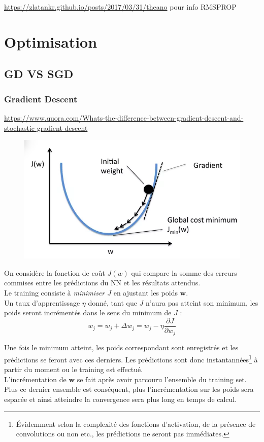 \documentclass[a4paper,12pt]{report}
\newcommand\bk{\color{black}}
\newcommand\brick{\color{brick}}
\numberwithin{equation}{section} %
\begin{document}
\url{https://zlatankr.github.io/posts/2017/03/31/theano} pour info RMSPROP
\pagebreak 
\section{Optimisation}
\brick \subsection{GD VS SGD} \bk
\subsubsection*{Gradient Descent}
\noindent \footnotesize{\url{https://www.quora.com/Whats-the-difference-between-gradient-descent-and-stochastic-gradient-descent} } \normalsize

\begin{figure} 
\vspace{-15pt}
\centering
\includegraphics[scale=0.5]{GD_climb.png}
\end{figure}

\noindent On considère la fonction de coût $J(w)$ qui compare la somme des erreurs commises entre les prédictions du NN et les résultats attendus.\\
Le training consiste à \textit{minimiser $J$} en ajustant les poids $\textbf{w}$. \\ Un taux d'apprentissage $\eta$ donné, tant que $J$ n'aura pas atteint son minimum, les poids seront incrémentés dans le sens du minimum de $J$ :
$$w_j = w_j + \Delta w_j = w_j - \eta \frac{\partial J }{\partial w_j} $$ 

\noindent Une fois le minimum atteint, les poids correspondant sont enregistrés et les prédictions se feront avec ces derniers. Les prédictions sont donc instantannées\footnote{Évidemment selon la complexité des fonctions d'activation, de la présence de convolutions ou non etc., les prédictions ne seront pas immédiates. } à partir du moment ou le training est effectué.\\
L'incrémentation de $\textbf{w}$ se fait après avoir parcouru l'ensemble du training set. Plus ce dernier ensemble est conséquent, plus l'incrémentation sur les poids sera espacée et ainsi atteindre la convergence sera plus long en temps de calcul.
\end{document}
